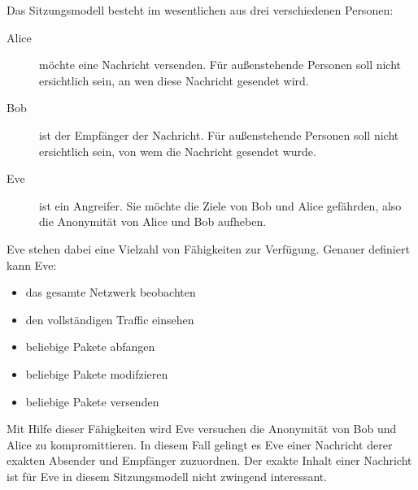 Das Sitzungsmodell besteht im wesentlichen aus drei verschiedenen Personen:
\begin{description}
	\item[Alice] möchte eine Nachricht versenden. Für außenstehende Personen soll nicht ersichtlich sein, an wen diese Nachricht gesendet wird.
	\item[Bob] ist der Empfänger der Nachricht. Für außenstehende Personen soll nicht ersichtlich sein, von wem die Nachricht gesendet wurde. 
	\item[Eve] ist ein Angreifer. Sie möchte die Ziele von Bob und Alice gefährden, also die Anonymität von Alice und Bob aufheben.
\end{description}

\newpage
Eve stehen dabei eine Vielzahl von Fähigkeiten zur Verfügung. Genauer definiert kann Eve:
\begin{itemize}
	\item das gesamte Netzwerk beobachten
	\item den vollständigen Traffic einsehen
	\item beliebige Pakete abfangen
	\item beliebige Pakete modifzieren
	\item beliebige Pakete versenden
\end{itemize}

Mit Hilfe dieser Fähigkeiten wird Eve versuchen die Anonymität von Bob und Alice zu kompromittieren. In diesem Fall gelingt es Eve einer Nachricht derer exakten Absender und Empfänger zuzuordnen. Der exakte Inhalt einer Nachricht ist für Eve in diesem Sitzungsmodell nicht zwingend interessant.